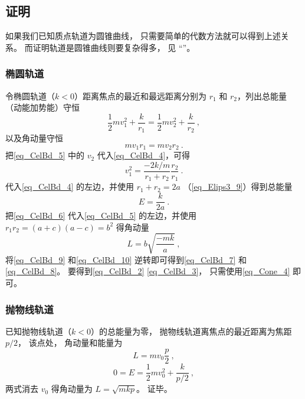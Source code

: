 \subsection{证明}
如果我们已知质点轨道为圆锥曲线， 只需要简单的代数方法就可以得到上述关系。 而证明轨道是圆锥曲线则要复杂得多， 见 “”。

\subsubsection{椭圆轨道}
令椭圆轨道（$k<0$）距离焦点的最近和最远距离分别为 $r_1$ 和 $r_2$，列出总能量（动能加势能）守恒
\begin{equation}\label{eq_CelBd_4}
\frac12 m v_1^2 + \frac{k}{r_1} = \frac12 mv_2^2 + \frac{k}{r_2}~,
\end{equation}
以及角动量守恒
\begin{equation}\label{eq_CelBd_5}
mv_1 r_1 = mv_2 r_2~.
\end{equation}
把\autoref{eq_CelBd_5} 中的 $v_2$ 代入\autoref{eq_CelBd_4}，可得
\begin{equation}\label{eq_CelBd_6}
v_1^2 = \frac{-2k/m}{r_1 + r_2} \frac{r_2}{r_1}~.
\end{equation}
代入\autoref{eq_CelBd_4} 的左边，并使用 $r_1+r_2=2a$ （\autoref{eq_Elips3_9}）得到总能量
\begin{equation}\label{eq_CelBd_9}
E = \frac{k}{2a}~.
\end{equation}
把\autoref{eq_CelBd_6} 代入\autoref{eq_CelBd_5} 的左边，并使用 $r_1 r_2 = (a+c)(a-c) =b^2$ %
得角动量
\begin{equation}\label{eq_CelBd_10}
L = b\sqrt{\frac{-mk}{a}}~,
\end{equation}
将\autoref{eq_CelBd_9} 和\autoref{eq_CelBd_10} 逆转即可得到\autoref{eq_CelBd_7} 和\autoref{eq_CelBd_8}。 要得到\autoref{eq_CelBd_2} \autoref{eq_CelBd_3}， 只需使用\autoref{eq_Cone_4} 即可。

\subsubsection{抛物线轨道}
已知抛物线轨道（$k<0$）的总能量为零， 抛物线轨道离焦点的最近距离为焦距 $p/2$， 该点处， 角动量和能量为
\begin{equation}
L = mv_0 \frac p2~,
\end{equation}
\begin{equation}
0 = E = \frac 12 mv_0^2 + \frac{k}{p/2}~,
\end{equation}
两式消去 $v_0$ 得角动量为 $L = \sqrt{mkp}$。 证毕。

